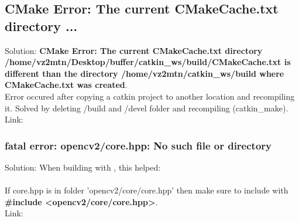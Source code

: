 \subsection{CMake Error: The current CMakeCache.txt directory ...}
\begin{bug}{}{}
	\caption{: .}
  Solution: \textbf{CMake Error: The current CMakeCache.txt directory /home/vz2mtn/Desktop/buffer/catkin\_ws/build/CMakeCache.txt is different than the directory /home/vz2mtn/catkin\_ws/build where CMakeCache.txt was created}.\\
Error occured after copying a catkin project to another location and recompiling it. Solved by deleting /build and /devel folder and recompiling 
(catkin\_make).\\
  Link: \\
\end{bug}


\subsubsection{ fatal error: opencv2/core.hpp: No such file or directory }
\begin{bug}{}{}
	\caption{: .}
  Solution: When building with , this helped:\\
\\
If core.hpp is in folder 'opencv2/core/core.hpp' then make sure to include with \textbf{\#include <opencv2/core/core.hpp>}.\\
  Link: \href{Maybee this helps}{}\\
\end{bug}

